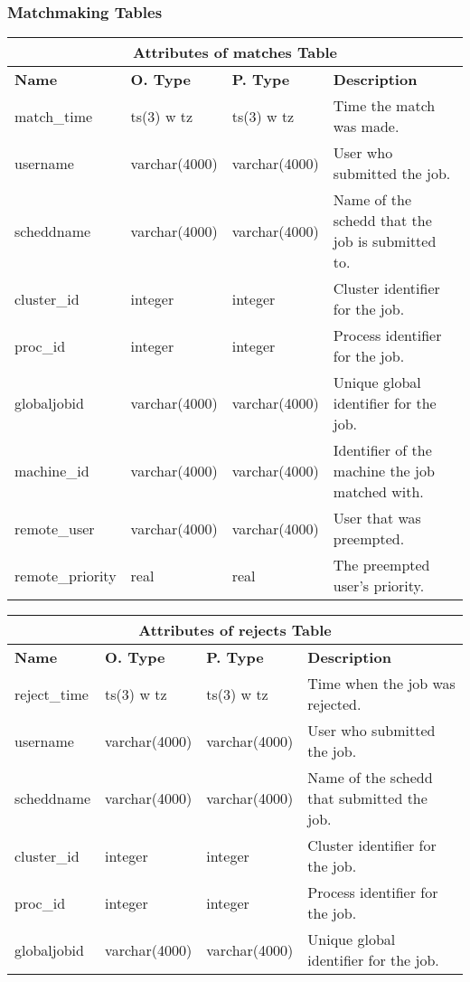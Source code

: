 \subsubsection{Matchmaking Tables}
\begin{center}
  \begin{tabular}{|l|l|l|p{3.0in}|}\hline
    \multicolumn{4}{|c|}{\textbf{Attributes of matches Table}}\\ \hline
    \textbf{Name} & \textbf{O. Type} & \textbf{P. Type} & \textbf{Description}\\ \hline
    match\_time & ts(3) w tz & ts(3) w tz & Time the match was made.\\ \hline
    username & varchar(4000) & varchar(4000) & User who submitted the job.\\ \hline
    scheddname & varchar(4000) & varchar(4000) & Name of the schedd that the job is submitted to.\\ \hline
    cluster\_id & integer & integer & Cluster identifier for the job.\\ \hline
    proc\_id & integer & integer & Process identifier for the job.\\ \hline
    globaljobid & varchar(4000) & varchar(4000) & Unique global identifier for the job.\\ \hline
    machine\_id & varchar(4000) & varchar(4000) & Identifier of the machine the job matched with.\\ \hline
    remote\_user & varchar(4000) & varchar(4000) & User that was preempted.\\ \hline
    remote\_priority & real & real & The preempted user's priority.\\ \hline
  \end{tabular}
\vspace{24pt}

  \begin{tabular}{|l|l|l|p{3.2in}|}\hline
    \multicolumn{4}{|c|}{\textbf{Attributes of rejects Table}}\\ \hline
    \textbf{Name} & \textbf{O. Type} & \textbf{P. Type} & \textbf{Description}\\ \hline
    reject\_time & ts(3) w tz & ts(3) w tz & Time when the job was rejected.\\ \hline
    username & varchar(4000) & varchar(4000) & User who submitted the job.\\ \hline
    scheddname & varchar(4000) & varchar(4000) & Name of the schedd that submitted the job.\\ \hline
    cluster\_id & integer & integer & Cluster identifier for the job.\\ \hline
    proc\_id & integer & integer & Process identifier for the job.\\ \hline    
    globaljobid & varchar(4000) & varchar(4000) & Unique global identifier for the job.\\ \hline
  \end{tabular}
\vspace{24pt}
\end{center}


